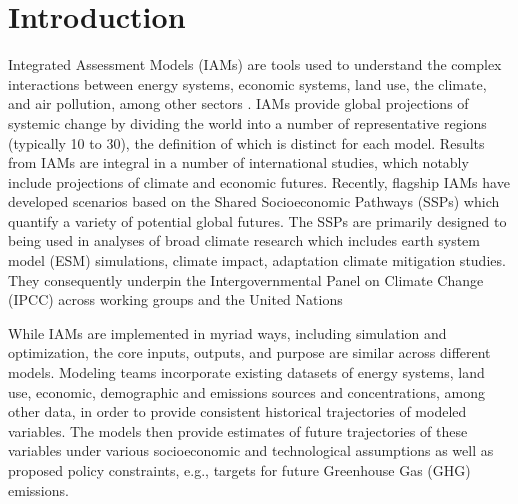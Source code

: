 \section{Introduction}

Integrated Assessment Models (IAMs) are tools used to understand the complex
interactions between energy systems, economic systems, land use, the climate,
and air pollution, among other sectors . IAMs provide global projections of
% 
% 
% 
systemic change by dividing the world into a number of representative regions (typically 10 to 30),
the definition of which is distinct for each model. Results from IAMs are
integral in a number of international studies, which notably include projections
of climate and economic futures. Recently, flagship IAMs have developed
scenarios based on the Shared Socioeconomic Pathways (SSPs)
\cite{van_vuuren_energy_2017, fricko_marker_2017, fujimori_ssp3:_2017,
  calvin_ssp4:_2017, kriegler_fossil-fueled_2017} which quantify a variety of
potential global futures. The SSPs are primarily designed to being used in analyses of broad climate research which includes earth system model (ESM) simulations, climate impact, adaptation climate mitigation studies. They consequently underpin the
Intergovernmental Panel on Climate Change (IPCC) across working groups and the United Nations
% 
% 
% 
% 

While IAMs are implemented in myriad ways, including simulation and
optimization, the core inputs, outputs, and purpose are similar across different
models. Modeling teams incorporate existing datasets of energy systems, land use, economic, demographic and emissions sources and concentrations, among other
data, in order to provide consistent historical trajectories of modeled
variables. The models then provide estimates of future trajectories of these
variables under various socioeconomic and technological assumptions as well as
proposed policy constraints, e.g., targets for future Greenhouse Gas (GHG)
emissions.

